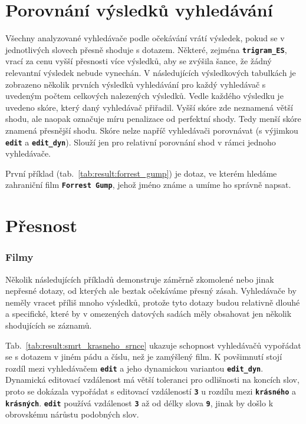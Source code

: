 \documentclass[11pt,letterpaper,oneside,openright]{book}
\newcommand{\bftt}[1]{\texttt{\textbf{#1}}}
\begin{document}
\section{Porovnání výsledků vyhledávání}
Všechny analyzované vyhledávače podle očekávání vrátí výsledek, pokud se v
jednotlivých slovech přesně shoduje s dotazem. Některé, zejména
\bftt{trigram\_ES}, vrací za cenu vyšší přesnosti více výsledků, aby se zvýšila
šance, že žádný relevantní výsledek nebude vynechán.  V následujících
výsledkových tabulkách je zobrazeno několik prvních výsledků vyhledávání pro
každý vyhledávač s uvedeným počtem celkových nalezených výsledků. Vedle každého
výsledku je uvedeno skóre, který daný vyhledávač přiřadil. Vyšší skóre zde
neznamená větší shodu, ale naopak označuje míru penalizace od perfektní shody.
Tedy menší skóre znamená přesnější shodu. Skóre nelze napříč vyhledávači
porovnávat (s výjimkou \bftt{edit} a \bftt{edit\_dyn}). Slouží jen pro
relativní porovnání shod v rámci jednoho vyhledávače.

\mbox{}\mbox{}

První příklad (tab.~\ref{tab:result:forrest_gump}) je dotaz, ve kterém hledáme
zahraniční film \bftt{Forrest Gump}, jehož jméno známe a umíme ho správně
napsat.

\section{Přesnost}
\subsubsection{Filmy}
Několik následujících příkladů demonstruje záměrně zkomolené nebo jinak
nepřesné dotazy, od kterých ale beztak očekáváme přesný zásah.
Vyhledávače by neměly vracet příliš mnoho výsledků, protože tyto dotazy
budou relativně dlouhé a specifické, které by v omezených datových
sadách měly obsahovat jen několik shodujících se záznamů.

\mbox{}\mbox{}

Tab.~\ref{tab:result:smrt_krasneho_srnce} ukazuje schopnost vyhledávačů
vypořádat se s dotazem v jiném pádu a číslu, než je zamýšlený film. K
povšimnutí stojí rozdíl mezi vyhledávačem \bftt{edit} a jeho dynamickou
variantou \bftt{edit\_dyn}. Dynamická editovací vzdálenost má větší toleranci
pro odlišnosti na koncích slov, proto se dokázala vypořádat s editovací
vzdáleností \bftt{3} u rozdílu mezi \bftt{krásného} a \bftt{krásných}.
\bftt{edit} používá vzdálenost \bftt{3} až od délky slova \bftt{9}, jinak by
došlo k obrovskému nárůstu podobných slov.
\end{document}
